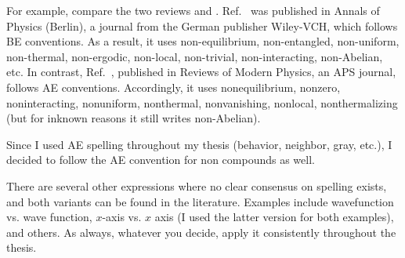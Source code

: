 For example, compare the two reviews \cite{abaninRecentProgressManybody2017} and \cite{abaninColloquiumManybodyLocalization2019}. Ref.~\cite{abaninRecentProgressManybody2017} was published in Annals of Physics (Berlin), a journal from the German publisher Wiley-VCH, which follows BE conventions. As a result, it uses non-equilibrium, non-entangled, non-uniform, non-thermal, non-ergodic, non-local, non-trivial, non-interacting, non-Abelian, etc. In contrast, Ref.~\cite{abaninColloquiumManybodyLocalization2019}, published in Reviews of Modern Physics, an APS journal, follows AE conventions. Accordingly, it uses nonequilibrium, nonzero, noninteracting, nonuniform, nonthermal, nonvanishing, nonlocal, nonthermalizing (but for inknown reasons it still writes non-Abelian).

Since I used AE spelling throughout my thesis (behavior, neighbor, gray, etc.), I decided to follow the AE convention for non compounds as well.

There are several other expressions where no clear consensus on spelling exists, and both variants can be found in the literature. Examples include wavefunction vs. wave function, $x$-axis vs. $x$ axis (I used the latter version for both examples), and others.
As always, whatever you decide, apply it consistently throughout the thesis.
